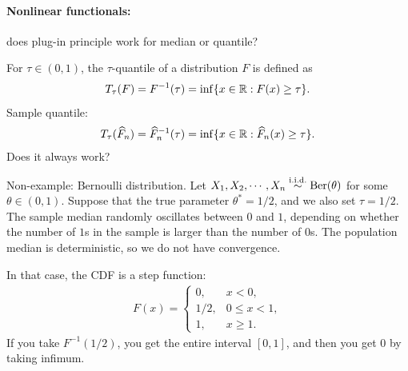 \documentclass[11pt,letterpaper]{article}
\numberwithin{assumption}{lecture}
\numberwithin{theorem}{lecture}
\numberwithin{proposition}{lecture}
\numberwithin{lemma}{lecture}
\numberwithin{claim}{lecture}
\numberwithin{corollary}{lecture}
\numberwithin{definition}{lecture}
\numberwithin{conjecture}{lecture}
\numberwithin{remark}{lecture}
\numberwithin{example}{lecture}
\numberwithin{equation}{lecture}
\begin{document}
\paragraph{Nonlinear functionals:} does plug-in principle work for median or quantile?

For $\tau \in (0, 1)$, the $\tau$-quantile of a distribution $F$ is defined as
\begin{align*}
  T_\tau (F) = F^{-1} (\tau) = \inf\{x \in \mathbb{R}: F(x) \geq \tau\}.
\end{align*}
Sample quantile:
\begin{align*}
  T_\tau (\widehat{F}_n) = \widehat{F}_n^{-1} (\tau) = \inf\{x \in \mathbb{R}: \widehat{F}_n(x) \geq \tau\}.
\end{align*}
Does it always work?

Non-example: Bernoulli distribution. Let $X_1, X_2, \cdots, X_n \overset{\mathrm{i.i.d.}}{\sim} \mathrm{Ber}(\theta)$ for some $\theta \in (0,1)$. Suppose that the true parameter $\theta^* = 1/2$, and we also set $\tau = 1/2$. The sample median randomly oscillates between $0$ and $1$, depending on whether the number of $1$s in the sample is larger than the number of $0$s. The population median is deterministic, so we do not have convergence.

In that case, the CDF is a step function:
\begin{align*}
   F(x) = \begin{cases}
     0, & x < 0,\\
     1/2, & 0 \leq x < 1,\\
     1, & x \geq 1.
   \end{cases}
\end{align*}
If you take $F^{-1} (1/2)$, you get the entire interval $[0, 1]$, and then you get $0$ by taking infimum.
\end{document}
